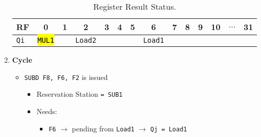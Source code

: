 \begin{enumerate}
    \newpage

    \begin{table}[!htp]
        \centering
        \begin{tabular}{@{} l | c c c c c c c c c c c c c @{}}
            \toprule
            RF              & 0                     & 1             & 2                     & 3             & 4             & 5             & 6                     & 7             & 8             & 9             & 10            & $\dots$           & 31            \\
            \midrule
            \texttt{Qi}     & \hl{\texttt{MUL1}}    &               & \texttt{Load2}        &               &               &               & \texttt{Load1}        &               &               &               &               &                   &               \\
            \bottomrule
        \end{tabular}
        \caption*{Register Result Status.}
    \end{table}

    \newpage


    \item \textbf{Cycle \theenumi}
    \begin{itemize}
        \item \texttt{SUBD  F8, F6, F2} is issued
        \begin{itemize}
            \item Reservation Station \texttt{= SUB1}
            \item Needs:
            \begin{itemize}
                \item \texttt{F6} $\rightarrow$ pending from \texttt{Load1} $\rightarrow$ \texttt{Qj = Load1}
                

\end{itemize}
\end{itemize}
\end{itemize}
\end{enumerate}
